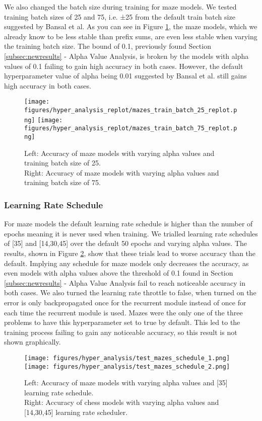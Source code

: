 We also changed the batch size during training for maze models. We tested training batch sizes of 25 and 75, i.e. ±25 from the default train batch size suggested by Bansal et al. As you can see in Figure \ref{figs:mazestrainbatch}, the maze models, which we already know to be less stable than prefix sums, are even less stable when varying the training batch size. The bound of 0.1, previously found Section \ref{subsec:newresults} - Alpha Value Analysis, is broken by the models with alpha values of 0.1 failing to gain high accuracy in both cases. However, the default hyperparameter value of alpha being 0.01 suggested by Bansal et al. still gains high accuracy in both cases.

\begin{figure}[h]
    \texttt{[image: figures/hyper\_analysis\_replot/mazes\_train\_batch\_25\_replot.png]}\hfill
    \texttt{[image: figures/hyper\_analysis\_replot/mazes\_train\_batch\_75\_replot.png]}
    \caption{
    Left: Accuracy of maze models with varying alpha values and training batch size of 25. \\
    Right: Accuracy of maze models with varying alpha values and training batch size of 75.}
    \label{figs:mazestrainbatch}
\end{figure}

\subsubsection{Learning Rate Schedule}
For maze models the default learning rate schedule is higher than the number of epochs meaning it is never used when training. We trialled learning rate schedules of [35] and [14,30,45] over the default 50 epochs and varying alpha values. The results, shown in Figure \ref{figs:schdules}, show that these trials lead to worse accuracy than the default. Implying any schedule for maze models only decreases the accuracy, as even models with alpha values above the threshold of 0.1 found in Section \ref{subsec:newresults} - Alpha Value Analysis fail to reach noticeable accuracy in both cases. We also turned the learning rate throttle to false, when turned on the error is only backpropagated once for the recurrent module instead of once for each time the recurrent module is used. Mazes were the only one of the three problems to have this hyperparameter set to true by default. This led to the training process failing to gain any noticeable accuracy, so this result is not shown graphically.

\begin{figure}[h]
    \texttt{[image: figures/hyper\_analysis/test\_mazes\_schedule\_1.png]}\hfill
    \texttt{[image: figures/hyper\_analysis/test\_mazes\_schedule\_2.png]}
    \caption{
    Left: Accuracy of maze models with varying alpha values and [35] learning rate schedule. \\
    Right: Accuracy of chess models with varying alpha values and [14,30,45] learning rate scheduler.}
    \label{figs:schdules}
\end{figure}

